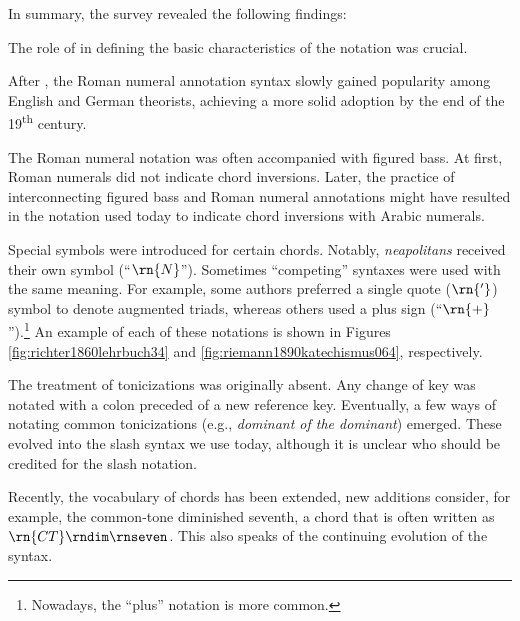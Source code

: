 In summary, the survey revealed the following findings:

The role of \textcite{weber1817versuch} in defining the
basic characteristics of the notation was crucial.


After \textcite{weber1817versuch}, the Roman numeral
annotation syntax slowly gained popularity among English and
German theorists, achieving a more solid adoption by the end
of the 19\textsuperscript{th} century.

 The Roman numeral notation was often accompanied with
figured bass. At first, Roman numerals did not indicate
chord inversions. Later, the practice of interconnecting
figured bass and Roman numeral annotations might have
resulted in the notation used today to indicate chord
inversions with Arabic numerals.

Special symbols were introduced for certain chords. Notably,
\emph{neapolitans} received their own symbol (``$\rn{N}$'').
Sometimes ``competing'' syntaxes were used with the same
meaning. For example, some authors preferred a single quote
($\rn{'}$) symbol to denote augmented triads, whereas others
used a plus sign (``$\rn{+}$'').\footnote{Nowadays, the
``plus'' notation is more common.} An example of each of
these notations is shown in Figures
\ref{fig:richter1860lehrbuch34} and
\ref{fig:riemann1890katechismus064}, respectively.

The treatment of tonicizations was originally absent. Any
change of key was notated with a colon preceded of a new
reference key. Eventually, a few ways of notating common
tonicizations (e.g., \emph{dominant of the dominant})
emerged. These evolved into the slash syntax we use today,
although it is unclear who should be credited for the slash
notation.

Recently, the vocabulary of chords has been extended, new
additions consider, for example, the common-tone diminished
seventh, a chord that is often written as
$\rn{CT}\rndim\rnseven$. This also speaks of the continuing
evolution of the syntax.

